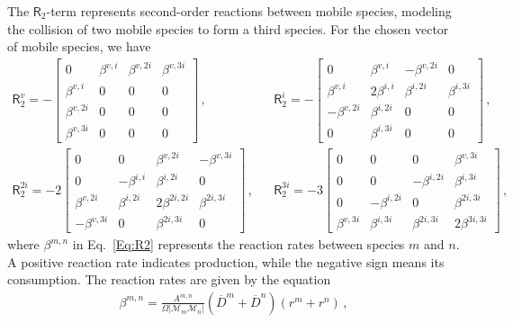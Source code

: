 \documentclass{article}
\newcommand{\spmat}[1]{\bm{\mathsf{#1}}}   %
\begin{document}
The $\spmat{R}_2$-term represents second-order reactions between mobile species, modeling the collision of two mobile species to form a third species. For the chosen vector of mobile species, we have
\begin{align}\label{Eq:R2} 
    {\spmat{R}}^{v}_{2} = -
\begin{bmatrix} 
0 & \beta^{v,i} & \beta^{v,2i} & \beta^{v,3i} \\ 
\beta^{v,i}  & 0 & 0 & 0 \\
\beta^{v,2i} & 0  & 0 & 0 \\
\beta^{v,3i} & 0 & 0 & 0
\end{bmatrix}\,, &&
%
    {\spmat{R}}^i_2 = -
\begin{bmatrix} 
0 & \beta^{v,i}  & -\beta^{v,2i} & 0 \\ 
\beta^{v,i}  & 2\beta^{i,i} & \beta^{i,2i} & {\beta^{i,3i}} \\
-\beta^{v,2i} & \beta^{i,2i}  & 0 & 0 \\
0 & {\beta^{i,3i}} & 0 & 0
\end{bmatrix}\,, \nonumber \\ 
%
%
    {\spmat{R}}^{2i}_{2} = -{2}
\begin{bmatrix} 
0 & 0  & \beta^{v,2i} & -\beta^{v,3i}  \\ 
0  & -\beta^{i,i} & \beta^{i,2i} & 0 \\
\beta^{v,2i} & \beta^{i,2i}  & {2\beta^{2i,2i}} & {\beta^{2i,3i}} \\
-\beta^{v,3i}  & 0 & {\beta^{2i,3i}} & 0
\end{bmatrix}\,,  &&
%
%
    {\spmat{R}}^{3i}_{2} = -{3}
\begin{bmatrix} 
0 & 0  & 0 & \beta^{v,3i}  \\ 
0  & 0 & -\beta^{i,2i} & {\beta^{i,3i}} \\
0 & -\beta^{i,2i}  & 0 & {\beta^{2i,3i}} \\
\beta^{v,3i}  & {\beta^{i,3i}} & {\beta^{2i,3i}} & {2\beta^{3i,3i}}
\end{bmatrix} \,,
\end{align}
where $\beta^{m,n}$ in Eq.~\eqref{Eq:R2} represents the reaction rates between species $m$ and $n$. 
A positive reaction rate  indicates  production, while the negative sign means its consumption. The reaction rates are given by the equation
\begin{align}
    \beta^{m,n} = \frac{A^{m,n}}{\Omega {|\mathcal{M}_m \mathcal{M}_n|}} (\overline{D}^{m} + \overline{D}^{n})  (r^{m} + r^{n}) \,,
\end{align}
\end{document}
